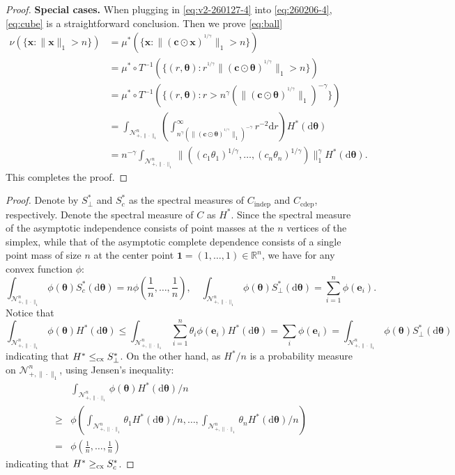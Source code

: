 \documentclass[12pt]{article}
\theoremstyle{plain}
\theoremstyle{plain}
\theoremstyle{definition}
\newcommand{\R}{\mathbb{R}}
\newcommand{\intd}{\mathrm{d}}
\newcommand{\punitsphereone}[1]{\mathcal{N}_{+,\|\cdot\|_1}^{#1}}
\begin{document}
\begin{proof}
\noindent\textbf{Special cases.}
When plugging in \eqref{eq:v2-260127-4} into \eqref{eq:260206-4}, \eqref{eq:cube} is a straightforward conclusion. Then we prove \eqref{eq:ball}
\begin{align*}
\nu(\{\mathbf{x}: \|\mathbf{x}\|_1>n \}) 
& = \mu^*( \{ \mathbf{x}: \|( {\mathbf c}\odot \mathbf{x})^{^{1/\gamma}}\|_1>n\}) \\
& = \mu^*\circ T^{-1}(\{(r,  \bm{\theta}): r^{^{1/\gamma}}\|( {\mathbf c}\odot \bm{\theta})^{^{1/\gamma}}\|_1>n\}) \\
& = \mu^*\circ T^{-1}(\{(r,  \bm{\theta}): r> n^{\gamma}\left(\|\left( {\mathbf c}\odot \bm{\theta}\right)^{^{1/\gamma}}\|_1\right)^{-\gamma}\}) \\
& = \int_{\punitsphereone{n}}\left(\int_{n^{\gamma}\left(\|( {\mathbf c}\odot \bm{\theta})^{^{1/\gamma}}\|_1\right)^{-\gamma}}^\infty r^{-2}\intd r\right)H^*(\mathrm{d}\bm{\theta})\\
& = n^{-\gamma}\int_{\punitsphereone{n}}\|((c_1{\theta}_1)^{1/\gamma},\dots,(c_n{\theta}_n)^{1/\gamma})\|_1^\gamma H^*(\mathrm{d}\bm{\theta}).
\end{align*} 
This completes the proof. 
\end{proof}




\PartialOrder*
\begin{proof}
Denote by $S_{\perp}^*$ and $S_c^*$ as the spectral measures of $C_\mathrm{indep}$ and $C_{\mathrm{cdep}}$, respectively. Denote the spectral measure of $C$ as $H^*$. Since the spectral measure of the asymptotic independence consists of point masses at the $n$ vertices of the simplex,  while that of the asymptotic complete dependence consists of
a single point mass of size $n$  at the center point $\mathbf{1}=(1,\dots,1)\in\R^n$, we have for any convex function $\phi$:
$$\int_{\punitsphereone{n}} \phi(\bm\theta)S_c^*(\intd\bm\theta) = n\phi\left(\frac{1}{n}, \dots, \frac{1}{n}\right), \quad \int_{\punitsphereone{n}} \phi(\bm\theta)S_\perp^*(\intd\bm\theta) = \sum_{i=1}^n\phi(\mathbf e_i).$$
Notice that 
\[
\int_{\punitsphereone{n}} \phi(\bm\theta)H^*(\intd\bm\theta)\le\int_{\punitsphereone{n}}\sum_{i=1}^n\theta_i\phi(\mathbf{e}_i)H^*(\intd\bm\theta)=\sum_i\phi(\mathbf e_i)=\int_{\punitsphereone{n}} \phi(\bm\theta)S_\perp^*(\intd\bm\theta)
\]
indicating that $H^*\le_{\rm cx} S_{\perp}^*$.
On the other hand, as $H^*/n$ is a probability measure on $\punitsphereone{n}$, using Jensen's inequality:
\begin{align*}
&\int_{\punitsphereone{n}} \phi(\bm\theta)H^*(\intd\bm\theta)/n \\
\geq&\phi\left(\int_{\punitsphereone{n}}\theta_1 H^*(\intd\bm\theta)/n,\dots,\int_{\punitsphereone{n}}\theta_n H^*(\intd\bm\theta)/n\right) \\
=&  \phi\left(\frac{1}{n}, \dots, \frac{1}{n}\right)    
\end{align*}
indicating that $H^*\ge_{\rm cx} S_c^*$.
\end{proof}
\end{document}
